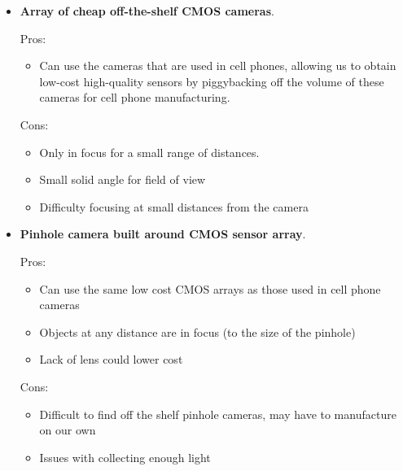\documentclass[10pt]{article}
\begin{document}
\begin{itemize}
\item \textbf{Array of cheap off-the-shelf CMOS cameras}.

Pros:
\begin{itemize}
\item Can use the cameras that are used in cell phones, allowing us to obtain low-cost high-quality sensors by piggybacking off the volume of these cameras for cell phone manufacturing.
\end{itemize}

Cons:
\begin{itemize}
\item Only in focus for a small range of distances.
\item Small solid angle for field of view
\item Difficulty focusing at small distances from the camera
\end{itemize}

\item \textbf{Pinhole camera built around CMOS sensor array}.

Pros:
\begin{itemize}
\item Can use the same low cost CMOS arrays as those used in cell phone cameras
\item Objects at any distance are in focus (to the size of the pinhole)
\item Lack of lens could lower cost
\end{itemize}

Cons:
\begin{itemize}
\item Difficult to find off the shelf pinhole cameras, may have to manufacture on our own
\item Issues with collecting enough light
\end{itemize}

\end{itemize}
\end{document}

